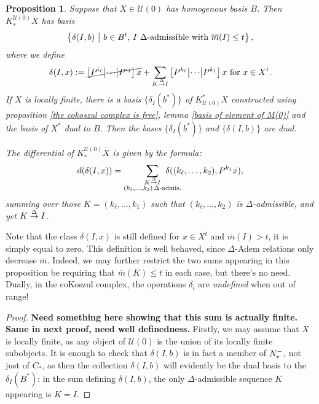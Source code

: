 \documentclass[11pt]{amsart}
\theoremstyle{plain}
\newtheorem{prop}[thm]{Proposition}
\theoremstyle{definition}
\newcommand{\calU}{\mathcal{U}}
\theoremstyle{plain}
\newcommand{\deltaalg}{\Delta} %
\newcommand{\minDimP}{\overline{m}}
\newcommand{\produces}[3]{#3:#1\sim #2}
\renewcommand{\produces}[3]{#1\rightarrow_{#3} #2}%
\renewcommand{\produces}[3]{#1\overset{\smash{#3}}{\rightarrow} #2}%
\newcommand{\Nop}{N^{\smash{-}}}
\begin{document}
\begin{Koszul complexes}
\begin{prop}\label{propDerivedIndTrivialUobject n=0}
Suppose that $X\in\calU(0)$ has homogenous basis $B$. Then $K_*^{\calU(0)}X$ has basis
\[\left\{\delta(I,b)\ \middle|\ b\in B^t\textup{, $I$ $\deltaalg$-admissible with }\minDimP(I)\leq t\right\},\]
where we define
\[\delta(I,x):=\cancel{\left[P^{i_\ell}\middle|\cdots\middle|P^{i_1} \right]x}+\sum_{\produces{K}{I}{\deltaalg}}\left[P^{k_\ell} \middle|\cdots\middle|P^{k_1} \right]x\textup{ for $x\in X^t$}.\]
%
If $X$ is locally finite, there is a basis $\{\delta_I(b^*)\}$ of $K^*_{\calU(0)}X$ constructed using proposition \ref{the cokoszul complex is free}, lemma \ref{basis of element of M(0)} and the basis of $X^*$ dual to $B$. Then the bases $\{\delta_I(b^*)\}$ and $\{\delta(I,b)\}$ are dual.

The differential of $K^{\calU(0)}_*X$ is given by the formula:
\[d(\delta(I,x))=\sum_{ \substack{\produces{K}{I}{\deltaalg}\\(k_{\ell},\ldots,k_2){\,\deltaalg\textup{-admis.}}}}\!\!\!\!\!\!\!\!\!\!\!\! \delta((k_{\ell},\ldots,k_2),P^{k_1}x),\]
summing over those $K=(k_{\ell},\ldots,k_1)$ such that $(k_{\ell},\ldots,k_2)$ is $\deltaalg$-admissible, and yet $\produces{K}{I}{\deltaalg}$.
\end{prop}
Note that the class $\delta(I,x)$ is still defined for $x\in X^t$ and $\minDimP(I)>t$, it is simply equal to zero. This definition is well behaved, since $\deltaalg$-Adem relations only decrease $\minDimP$. Indeed, we may further restrict the two sums appearing in this proposition be requiring that $\minDimP(K)\leq t$ in each case, but there's no need. Dually, in the coKoszul complex, the operations $\delta_i$ are \emph{undefined} when out of range!
\begin{proof}\textbf{Need something here showing that this sum is actually finite. Same in next proof, need well definedness.}
Firstly, we may assume that $X$ is locally finite, as any object of $\calU(0)$ is the union of its locally finite subobjects. It is enough to check that $\delta(I,b)$ is in fact a member of $\Nop_*$, not just of $C_*$, as then the collection $\delta(I,b)$ will evidently be the dual basis to the $\delta_I(B^*)$: in the sum defining $\delta(I,b)$, the only $\deltaalg$-admissible sequence $K$ appearing is $K=I$.  %


\end{proof}
\end{Koszul complexes}
\end{document}
